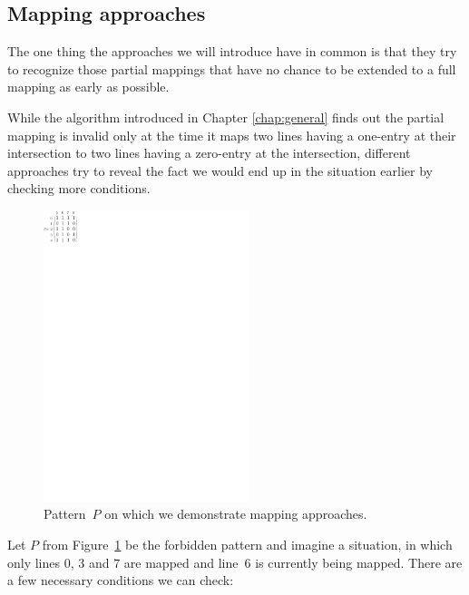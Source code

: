 \subsection{Mapping approaches}
\label{sect:approaches}
The one thing the approaches we will introduce have in common is that they try to recognize those partial mappings that have no chance to be extended to a full mapping as early as possible.

While the algorithm introduced in Chapter \ref{chap:general} finds out the partial mapping is invalid only at the time it maps two lines having a one-entry at their intersection to two lines having a zero-entry at the intersection, different approaches try to reveal the fact we would end up in the situation earlier by checking more conditions.
\begin{figure}[h!]
\centering
\includegraphics[width=60mm]{../img/approaches.pdf}
\caption{Pattern~$P$ on which we demonstrate mapping approaches.}
\label{approaches}
\end{figure}
Let $P$ from Figure~\ref{approaches} be the forbidden pattern and imagine a situation, in which only lines $0$, $3$ and $7$ are mapped and line~$6$ is currently being mapped. There are a few necessary conditions we can check:
